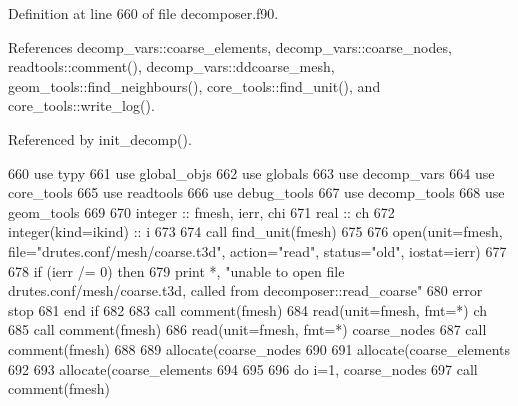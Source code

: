 Definition at line 660 of file decomposer.\+f90.



References decomp\+\_\+vars\+::coarse\+\_\+elements, decomp\+\_\+vars\+::coarse\+\_\+nodes, readtools\+::comment(), decomp\+\_\+vars\+::ddcoarse\+\_\+mesh, geom\+\_\+tools\+::find\+\_\+neighbours(), core\+\_\+tools\+::find\+\_\+unit(), and core\+\_\+tools\+::write\+\_\+log().



Referenced by init\+\_\+decomp().


\begin{DoxyCode}
660       \textcolor{keywordtype}{use }typy
661       \textcolor{keywordtype}{use }global_objs
662       \textcolor{keywordtype}{use }globals
663       \textcolor{keywordtype}{use }decomp_vars
664       \textcolor{keywordtype}{use }core_tools
665       \textcolor{keywordtype}{use }readtools
666       \textcolor{keywordtype}{use }debug_tools
667       \textcolor{keywordtype}{use }decomp_tools
668       \textcolor{keywordtype}{use }geom_tools
669 
670       \textcolor{keywordtype}{integer} :: fmesh, ierr, chi
671       \textcolor{keywordtype}{real} :: ch
672       \textcolor{keywordtype}{integer(kind=ikind)} :: i
673 
674       \textcolor{keyword}{call }find_unit(fmesh)
675     
676       \textcolor{keyword}{open}(unit=fmesh, file=\textcolor{stringliteral}{"drutes.conf/mesh/coarse.t3d"}, action=\textcolor{stringliteral}{"read"}\textcolor{comment}{, status=}\textcolor{stringliteral}{"old"}\textcolor{comment}{, iostat=ierr)}
677 \textcolor{comment}{  }
678 \textcolor{comment}{      }\textcolor{keywordflow}{if} (ierr /= 0) \textcolor{keywordflow}{then}
679         print *, \textcolor{stringliteral}{"unable to open file drutes.conf/mesh/coarse.t3d, called from decomposer::read\_coarse"}
680         error stop
681 \textcolor{keywordflow}{      end if}
682 
683       \textcolor{keyword}{call }comment(fmesh)
684       \textcolor{keyword}{read}(unit=fmesh, fmt=*) ch
685       \textcolor{keyword}{call }comment(fmesh)
686       \textcolor{keyword}{read}(unit=fmesh, fmt=*) coarse_nodes%
687       \textcolor{keyword}{call }comment(fmesh) 
688 
689       \textcolor{keyword}{allocate}(coarse_nodes%
690     
691       \textcolor{keyword}{allocate}(coarse_elements%
692       
693       \textcolor{keyword}{allocate}(coarse_elements%
694       
695 
696       \textcolor{keywordflow}{do} i=1, coarse_nodes%
697         \textcolor{keyword}{call }comment(fmesh)

\end{DoxyCode}
